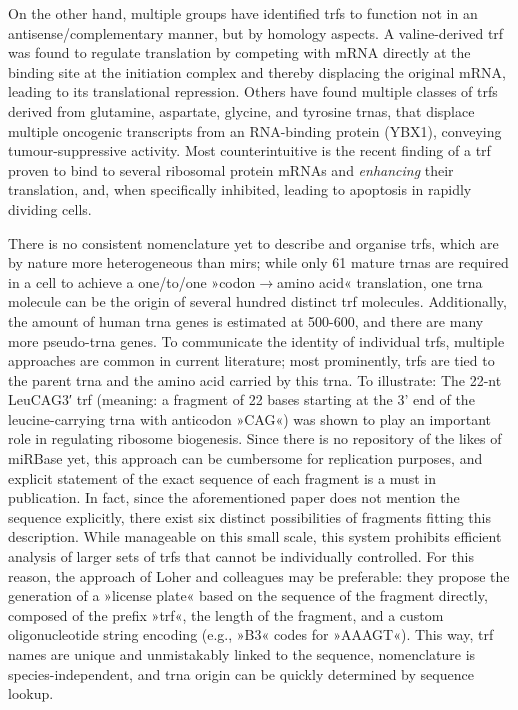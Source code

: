 On the other hand, multiple groups have identified \acp{trf} to function not in an antisense\-/complementary manner, but by homology aspects. A valine-derived \ac{trf} was found to regulate translation by competing with mRNA directly at the binding site at the initiation complex and thereby displacing the original mRNA, leading to its translational repression.\cite{Gebetsberger2017} Others have found multiple classes of \acp{trf} derived from glutamine, aspartate, glycine, and tyrosine \acp{trna}, that displace multiple oncogenic transcripts from an RNA-binding protein (YBX1), conveying tumour-suppressive activity.\cite{Goodarzi2015} Most counterintuitive is the recent finding of a \ac{trf} proven to bind to several ribosomal protein mRNAs and \emph{enhancing} their translation, and, when specifically inhibited, leading to apoptosis in rapidly dividing cells.\cite{Kim2017}

There is no consistent nomenclature yet to describe and organise \acp{trf}, which are by nature more heterogeneous than \acp{mir}; while only 61 mature \acp{trna} are required in a cell to achieve a one\-/to\-/one »codon$\to$amino acid« translation, one \ac{trna} molecule can be the origin of several hundred distinct \ac{trf} molecules. Additionally, the amount of human \ac{trna} genes is estimated at 500-600,\cite{Parisien2013} and there are many more pseudo-\ac{trna} genes. To communicate the identity of individual \acp{trf}, multiple approaches are common in current literature; most prominently, \acp{trf} are tied to the parent \ac{trna} and the amino acid carried by this \ac{trna}. To illustrate: The 22-nt LeuCAG3′ \ac{trf} (meaning: a fragment of 22 bases starting at the 3' end of the leucine-carrying \ac{trna} with anticodon »CAG«) was shown to play an important role in regulating ribosome biogenesis.\cite{Kim2017} Since there is no repository of the likes of miRBase yet, this approach can be cumbersome for replication purposes, and explicit statement of the exact sequence of each fragment is a must in publication. In fact, since the aforementioned paper does not mention the sequence explicitly, there exist six distinct possibilities of fragments fitting this description. While manageable on this small scale, this system prohibits efficient analysis of larger sets of \acp{trf} that cannot be individually controlled. For this reason, the approach of Loher and colleagues\cite{Loher2017} may be preferable: they propose the generation of a »license plate« based on the sequence of the fragment directly, composed of the prefix »\ac{trf}«, the length of the fragment, and a custom oligonucleotide string encoding (e.g., »B3« codes for »AAAGT«). This way, \ac{trf} names are unique and unmistakably linked to the sequence, nomenclature is species-independent, and \ac{trna} origin can be quickly determined by sequence lookup.

